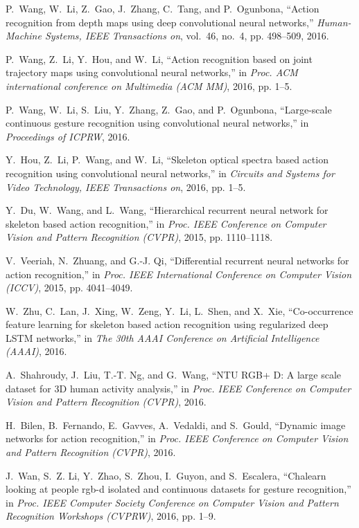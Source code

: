\documentclass[10pt, a4paper, conference]{IEEEtran}
\begin{document}
\begin{thebibliography}{10}
P.~Wang, W.~Li, Z.~Gao, J.~Zhang, C.~Tang, and P.~Ogunbona, ``Action
  recognition from depth maps using deep convolutional neural networks,''
  \emph{Human-Machine Systems, IEEE Transactions on}, vol.~46, no.~4, pp.
  498--509, 2016.

P.~Wang, Z.~Li, Y.~Hou, and W.~Li, ``Action recognition based on joint
  trajectory maps using convolutional neural networks,'' in \emph{Proc. ACM
  international conference on Multimedia (ACM MM)}, 2016, pp. 1--5.

P.~Wang, W.~Li, S.~Liu, Y.~Zhang, Z.~Gao, and P.~Ogunbona, ``Large-scale
  continuous gesture recognition using convolutional neural networks,'' in
  \emph{Proceedings of ICPRW}, 2016.

Y.~Hou, Z.~Li, P.~Wang, and W.~Li, ``Skeleton optical spectra based action
  recognition using convolutional neural networks,'' in \emph{Circuits and
  Systems for Video Technology, IEEE Transactions on}, 2016, pp. 1--5.

Y.~Du, W.~Wang, and L.~Wang, ``Hierarchical recurrent neural network for
  skeleton based action recognition,'' in \emph{Proc. IEEE Conference on
  Computer Vision and Pattern Recognition (CVPR)}, 2015, pp. 1110--1118.

V.~Veeriah, N.~Zhuang, and G.-J. Qi, ``Differential recurrent neural networks
  for action recognition,'' in \emph{Proc. IEEE International Conference on
  Computer Vision (ICCV)}, 2015, pp. 4041--4049.

W.~Zhu, C.~Lan, J.~Xing, W.~Zeng, Y.~Li, L.~Shen, and X.~Xie, ``Co-occurrence
  feature learning for skeleton based action recognition using regularized deep
  {LSTM} networks,'' in \emph{The 30th AAAI Conference on Artificial
  Intelligence (AAAI)}, 2016.

A.~Shahroudy, J.~Liu, T.-T. Ng, and G.~Wang, ``{NTU RGB+ D}: A large scale
  dataset for {3D} human activity analysis,'' in \emph{Proc. IEEE Conference on
  Computer Vision and Pattern Recognition (CVPR)}, 2016.

H.~Bilen, B.~Fernando, E.~Gavves, A.~Vedaldi, and S.~Gould, ``Dynamic image
  networks for action recognition,'' in \emph{Proc. IEEE Conference on Computer
  Vision and Pattern Recognition (CVPR)}, 2016.

J.~Wan, S.~Z. Li, Y.~Zhao, S.~Zhou, I.~Guyon, and S.~Escalera, ``Chalearn
  looking at people rgb-d isolated and continuous datasets for gesture
  recognition,'' in \emph{Proc. IEEE Computer Society Conference on Computer
  Vision and Pattern Recognition Workshops (CVPRW)}, 2016, pp. 1--9.


\end{thebibliography}
\end{document}
